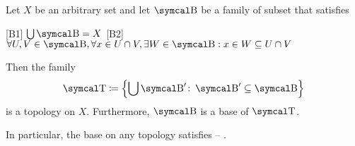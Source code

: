 \begin{proposition}\label{thm:topological_base_axioms}\cite[12]{Engelking1989}
  Let \( X \) be an arbitrary set and let \( \CB \) be a family of subset that satisfies
  \begin{description}
    [B1] \( \bigcup \CB = X \)
    [B2] \( \forall U, V \in \CB, \forall x \in U \cap V, \exists W \in \CB: x \in W \subseteq U \cap V \)
  \end{description}

  Then the family
  \begin{align}\label{thm:topological_base_axioms/topology}
    \CT \coloneqq \left\{ \bigcup \CB' \colon \CB' \subseteq \CB \right\}
  \end{align}
  is a topology on \( X \). Furthermore, \( \CB \) is a base of \( \CT \).

  In particular, the base on any topology satisfies  -- .
\end{proposition}
